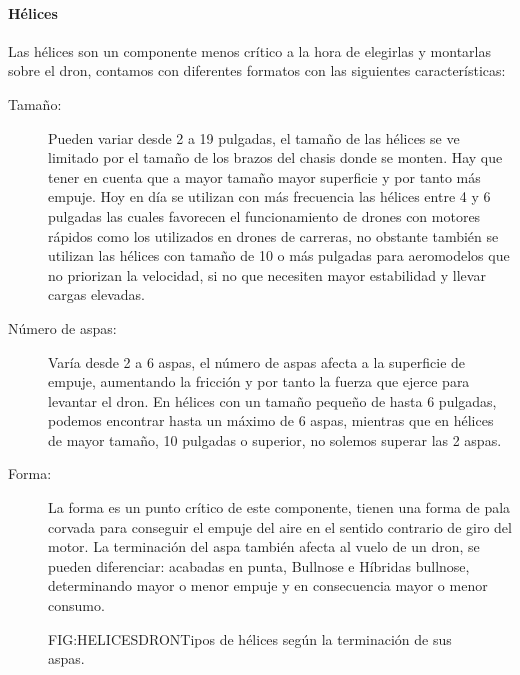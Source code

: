  
\paragraph{Hélices}
\label{SSS:Helices}

 Las hélices son un componente menos crítico a la hora de elegirlas y montarlas sobre el dron, contamos con diferentes formatos con las siguientes características:
 \begin{description}
        \item[Tamaño:] Pueden variar desde 2 a 19 pulgadas, el tamaño de las hélices se ve limitado por el tamaño de los brazos del chasis donde se monten. Hay que tener en cuenta que a mayor tamaño mayor superficie y por tanto más empuje. Hoy en día se utilizan con más frecuencia las hélices entre 4 y 6 pulgadas las cuales favorecen el funcionamiento de drones con motores rápidos como los utilizados en drones de carreras, no obstante también se utilizan las hélices con tamaño de 10 o más pulgadas para aeromodelos que no priorizan la velocidad, si no que necesiten mayor estabilidad y llevar cargas elevadas.
 		\item[Número de aspas:] Varía desde 2 a 6 aspas, el número de aspas afecta a la superficie de empuje, aumentando la fricción y por tanto la fuerza que ejerce para levantar el dron. En hélices con un  tamaño pequeño de hasta 6 pulgadas, podemos encontrar hasta un máximo de 6 aspas, mientras que en hélices de mayor tamaño, 10 pulgadas o superior, no solemos superar las 2 aspas.
 		\item[Forma:] La forma es un punto crítico de este componente, tienen una forma de pala corvada para conseguir el empuje del aire en el sentido contrario de giro del motor. La terminación del aspa también afecta al vuelo de un dron, se pueden diferenciar: acabadas en punta,  Bullnose e Híbridas bullnose, determinando mayor o menor empuje y en consecuencia mayor o menor consumo.

 
 \end{description}
 
 \begin{figure}[Tipos de hélices dron]{FIG:HELICESDRON}{Tipos de hélices según  la terminación de sus aspas.}
   \quad
   \quad
\end{figure} 


